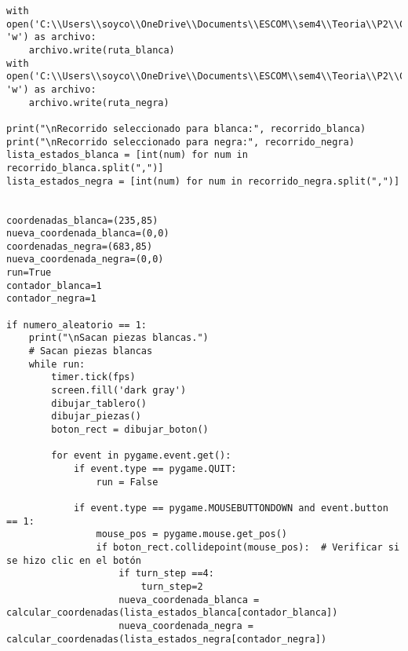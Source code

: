 \begin{lstlisting}
with open('C:\\Users\\soyco\\OneDrive\\Documents\\ESCOM\\sem4\\Teoria\\P2\\Chess\\output\\ruta_blanca.txt', 'w') as archivo:
    archivo.write(ruta_blanca)
with open('C:\\Users\\soyco\\OneDrive\\Documents\\ESCOM\\sem4\\Teoria\\P2\\Chess\\output\\ruta_negra.txt', 'w') as archivo:
    archivo.write(ruta_negra)

print("\nRecorrido seleccionado para blanca:", recorrido_blanca)
print("\nRecorrido seleccionado para negra:", recorrido_negra)
lista_estados_blanca = [int(num) for num in recorrido_blanca.split(",")]
lista_estados_negra = [int(num) for num in recorrido_negra.split(",")]


coordenadas_blanca=(235,85)
nueva_coordenada_blanca=(0,0)
coordenadas_negra=(683,85)
nueva_coordenada_negra=(0,0)
run=True
contador_blanca=1
contador_negra=1

if numero_aleatorio == 1:
    print("\nSacan piezas blancas.")
    # Sacan piezas blancas
    while run:
        timer.tick(fps)
        screen.fill('dark gray')
        dibujar_tablero()
        dibujar_piezas()
        boton_rect = dibujar_boton()

        for event in pygame.event.get():
            if event.type == pygame.QUIT:
                run = False

            if event.type == pygame.MOUSEBUTTONDOWN and event.button == 1:
                mouse_pos = pygame.mouse.get_pos()
                if boton_rect.collidepoint(mouse_pos):  # Verificar si se hizo clic en el botón
                    if turn_step ==4:
                        turn_step=2
                    nueva_coordenada_blanca = calcular_coordenadas(lista_estados_blanca[contador_blanca])
                    nueva_coordenada_negra = calcular_coordenadas(lista_estados_negra[contador_negra])
                    

\end{lstlisting}
